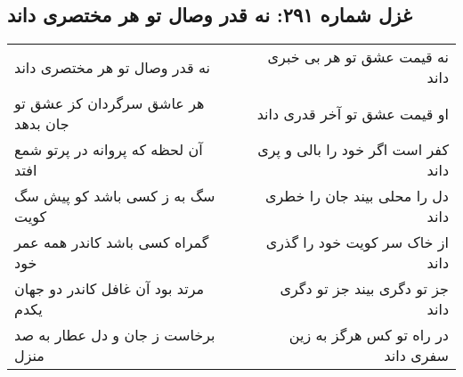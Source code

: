 \begin{center}
\section*{غزل شماره ۲۹۱: نه قدر وصال تو هر مختصری داند}
\label{sec:291}
\begin{longtable}{l p{0.5cm} r}
نه قدر وصال تو هر مختصری داند
&&
نه قیمت عشق تو هر بی خبری داند
\\
هر عاشق سرگردان کز عشق تو جان بدهد
&&
او قیمت عشق تو آخر قدری داند
\\
آن لحظه که پروانه در پرتو شمع افتد
&&
کفر است اگر خود را بالی و پری داند
\\
سگ به ز کسی باشد کو پیش سگ کویت
&&
دل را محلی بیند جان را خطری داند
\\
گمراه کسی باشد کاندر همه عمر خود
&&
از خاک سر کویت خود را گذری داند
\\
مرتد بود آن غافل کاندر دو جهان یکدم
&&
جز تو دگری بیند جز تو دگری داند
\\
برخاست ز جان و دل عطار به صد منزل
&&
در راه تو کس هرگز به زین سفری داند
\\
\end{longtable}
\end{center}
